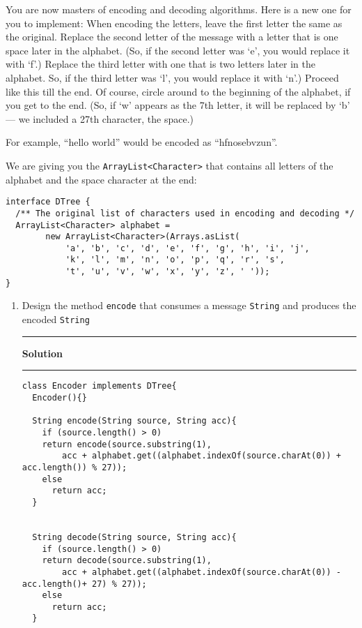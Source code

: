 \documentclass[11pt]{article}
\def\thel{\noindent\rule{2.5cm}{.5pt}}
\def\begsol#1{\thel {\bf Solution} \thel}\def\endsol{\relax}
\def\pts#1{\marginpar{\footnotesize \raggedright  \fbox{#1 {\sc Points}}}}
\newcounter{Pctr}
\newenvironment{problem}{\stepcounter{Pctr}%
\begin{description}
\item[\noindent{\bf Problem} \arabic{Pctr}]
\end{description}}{\relax}
\begin{document}
\newpage
\pts{10}
\begin{problem}
You are now masters of encoding and decoding algorithms. Here is a new
one for you to implement: When encoding the letters, leave the first
letter the same as the original. Replace the second letter of the
message with a letter that is one space later in the alphabet. (So, if
the second letter was `e', you would replace it with `f'.) Replace the
third letter with one that is two letters later in the alphabet. So,
if the third letter was `l', you would replace it with `n'.) Proceed
like this till the end. Of course, circle around to the beginning of
the alphabet, if you get to the end. (So, if `w' appears as the 7th
letter, it will be replaced by `b' --- we included a 27th character,
the space.)

For example, ``hello world'' would be encoded as ``hfnosebvzun''.

We are giving you the \texttt{ArrayList<Character>} that contains all
letters of the alphabet and the space character at the end:

\begin{verbatim}
interface DTree {
  /** The original list of characters used in encoding and decoding */
  ArrayList<Character> alphabet = 
        new ArrayList<Character>(Arrays.asList(
            'a', 'b', 'c', 'd', 'e', 'f', 'g', 'h', 'i', 'j', 
            'k', 'l', 'm', 'n', 'o', 'p', 'q', 'r', 's', 
            't', 'u', 'v', 'w', 'x', 'y', 'z', ' '));
}
\end{verbatim}

\newpage
\begin{enumerate}
\item Design the method \texttt{encode} that consumes a message
  \texttt{String} and produces the encoded \texttt{String}



\begsol{\vspace{0.5in}}
\begin{verbatim}
class Encoder implements DTree{
  Encoder(){}
  
  String encode(String source, String acc){
    if (source.length() > 0)
    return encode(source.substring(1),
        acc + alphabet.get((alphabet.indexOf(source.charAt(0)) + acc.length()) % 27));
    else 
      return acc;
  }

  
  String decode(String source, String acc){
    if (source.length() > 0)
    return decode(source.substring(1),
        acc + alphabet.get((alphabet.indexOf(source.charAt(0)) - acc.length()+ 27) % 27));
    else 
      return acc;
  }
  

\end{verbatim}
\end{enumerate}
\end{problem}
\end{document}
